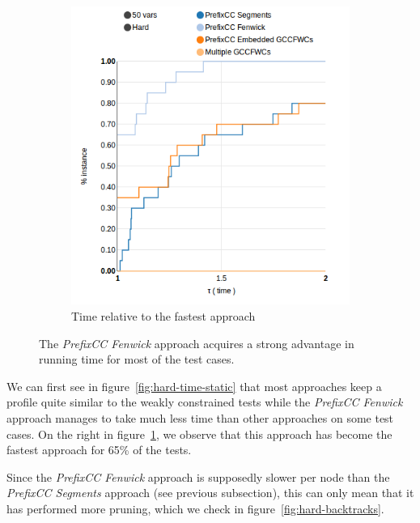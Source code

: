 \documentclass[a4paper,10pt]{article}
\begin{document}
\begin{figure}
\begin{subfigure}[b]{0.45\textwidth}
        \includegraphics[width=\textwidth]{img/hard25-50vars-time}
        \caption{Time relative to the fastest approach}
        \label{fig:hard-time-dynamic}
    \end{subfigure}
    
    \caption{The \emph{PrefixCC Fenwick} approach acquires a strong advantage in running time for most of the test cases.}
    \label{fig:hard-time}
\end{figure}

We can first see in figure~\ref{fig:hard-time-static} that most approaches keep a profile quite similar to the weakly constrained tests while the \emph{PrefixCC Fenwick} approach manages to take much less time than other approaches on some test cases. On the right in figure~\ref{fig:hard-time-dynamic}, we observe that this approach has become the fastest approach for 65\% of the tests.

Since the \emph{PrefixCC Fenwick} approach is supposedly slower per node than the \emph{PrefixCC Segments} approach (see previous subsection), this can only mean that it has performed more pruning, which we check in figure~\ref{fig:hard-backtracks}.
\end{document}
